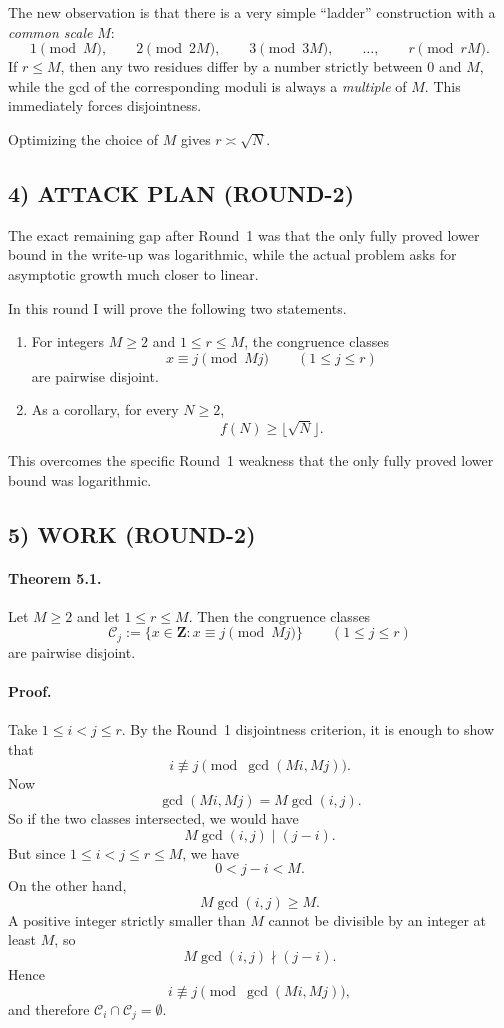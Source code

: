 The new observation is that there is a very simple ``ladder'' construction with a \emph{common scale} $M$:
\[
1 \pmod M,\qquad 2 \pmod{2M},\qquad 3 \pmod{3M},\qquad \ldots,\qquad r \pmod{rM}.
\]
If $r\le M$, then any two residues differ by a number strictly between $0$ and $M$, while the gcd of the corresponding moduli is always a \emph{multiple} of $M$. This immediately forces disjointness.

Optimizing the choice of $M$ gives $r\asymp \sqrt{N}$.

\subsection*{4) ATTACK PLAN (ROUND-2)}

The exact remaining gap after Round~1 was that the only fully proved lower bound in the write-up was logarithmic, while the actual problem asks for asymptotic growth much closer to linear.

In this round I will prove the following two statements.

\begin{enumerate}
\item For integers $M\ge 2$ and $1\le r\le M$, the congruence classes
\[
x\equiv j \pmod{Mj}\qquad (1\le j\le r)
\]
are pairwise disjoint.

\item As a corollary, for every $N\ge 2$,
\[
f(N)\ge \lfloor \sqrt N\rfloor.
\]
\end{enumerate}

This overcomes the specific Round~1 weakness that the only fully proved lower bound was logarithmic.

\subsection*{5) WORK (ROUND-2)}

\paragraph{Theorem 5.1.}
Let $M\ge 2$ and let $1\le r\le M$. Then the congruence classes
\[
\mathcal{C}_j:=\{x\in \mathbf{Z}: x\equiv j \pmod{Mj}\}\qquad (1\le j\le r)
\]
are pairwise disjoint.

\paragraph{Proof.}
Take $1\le i<j\le r$. By the Round~1 disjointness criterion, it is enough to show that
\[
i\not\equiv j \pmod{\gcd(Mi,Mj)}.
\]
Now
\[
\gcd(Mi,Mj)=M\gcd(i,j).
\]
So if the two classes intersected, we would have
\[
M\gcd(i,j)\mid (j-i).
\]
But since $1\le i<j\le r\le M$, we have
\[
0<j-i<M.
\]
On the other hand,
\[
M\gcd(i,j)\ge M.
\]
A positive integer strictly smaller than $M$ cannot be divisible by an integer at least $M$, so
\[
M\gcd(i,j)\nmid (j-i).
\]
Hence
\[
i\not\equiv j \pmod{\gcd(Mi,Mj)},
\]
and therefore $\mathcal{C}_i\cap \mathcal{C}_j=\emptyset$.

